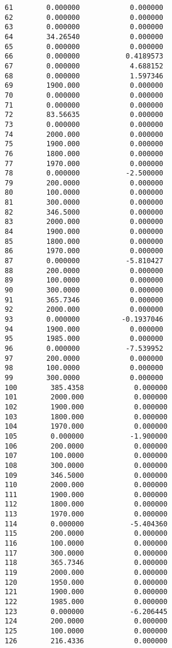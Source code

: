 \documentclass[12pt]{article}
\begin{document}
\begin{appendices}
\begin{lstlisting}
61        0.000000            0.000000
62        0.000000            0.000000
63        0.000000            0.000000
64        34.26540            0.000000
65        0.000000            0.000000
66        0.000000           0.4189573
67        0.000000            4.688152
68        0.000000            1.597346
69        1900.000            0.000000
70        0.000000            0.000000
71        0.000000            0.000000
72        83.56635            0.000000
73        0.000000            0.000000
74        2000.000            0.000000
75        1900.000            0.000000
76        1800.000            0.000000
77        1970.000            0.000000
78        0.000000           -2.500000
79        200.0000            0.000000
80        100.0000            0.000000
81        300.0000            0.000000
82        346.5000            0.000000
83        2000.000            0.000000
84        1900.000            0.000000
85        1800.000            0.000000
86        1970.000            0.000000
87        0.000000           -5.810427
88        200.0000            0.000000
89        100.0000            0.000000
90        300.0000            0.000000
91        365.7346            0.000000
92        2000.000            0.000000
93        0.000000          -0.1937046
94        1900.000            0.000000
95        1985.000            0.000000
96        0.000000           -7.539952
97        200.0000            0.000000
98        100.0000            0.000000
99        300.0000            0.000000
100        385.4358            0.000000
101        2000.000            0.000000
102        1900.000            0.000000
103        1800.000            0.000000
104        1970.000            0.000000
105        0.000000           -1.900000
106        200.0000            0.000000
107        100.0000            0.000000
108        300.0000            0.000000
109        346.5000            0.000000
110        2000.000            0.000000
111        1900.000            0.000000
112        1800.000            0.000000
113        1970.000            0.000000
114        0.000000           -5.404360
115        200.0000            0.000000
116        100.0000            0.000000
117        300.0000            0.000000
118        365.7346            0.000000
119        2000.000            0.000000
120        1950.000            0.000000
121        1900.000            0.000000
122        1985.000            0.000000
123        0.000000           -6.206445
124        200.0000            0.000000
125        100.0000            0.000000
126        216.4336            0.000000

\end{lstlisting}
\end{appendices}
\end{document}
